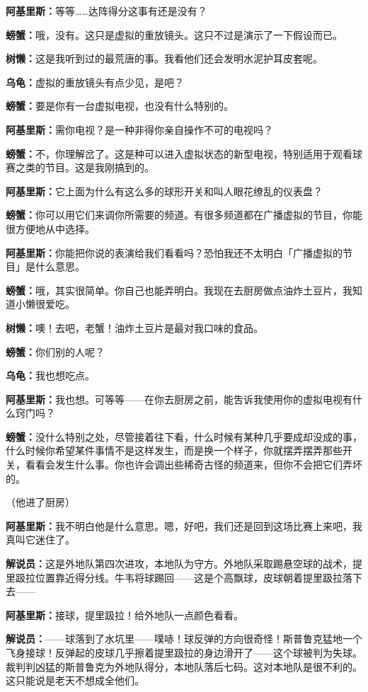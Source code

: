 \documentclass[
  12pt,
  twoside,
  openright,
  oldfontcommands,
]{memoir}
\newcommand{\dialogname}[1]{{\heifamily\bfseries #1}}
\begin{document}
\dialogname{阿基里斯：}等等\ldots\ldots 达阵得分这事有还是没有？

\dialogname{螃蟹：}哦，没有。这只是虚拟的重放镜头。这只不过是演示了一下假设而已。

\dialogname{树懒：}这是我听到过的最荒唐的事。我看他们还会发明水泥护耳皮套呢。

\dialogname{乌龟：}虚拟的重放镜头有点少见，是吧？

\dialogname{螃蟹：}要是你有一台虚拟电视，也没有什么特别的。

\dialogname{阿基里斯：}需你电视？是一种非得你亲自操作不可的电视吗？

\dialogname{螃蟹：}不，你理解岔了。这是种可以进入虚拟状态的新型电视，特别适用于观看球赛之类的节目。这是我刚搞到的。

\dialogname{阿基里斯：}它上面为什么有这么多的球形开关和叫人眼花缭乱的仪表盘？

\dialogname{螃蟹：}你可以用它们来调你所需要的频道。有很多频道都在广播虚拟的节目，你能很方便地从中选择。

\dialogname{阿基里斯：}你能把你说的表演给我们看看吗？恐怕我还不太明白「广播虚拟的节目」是什么意思。

\dialogname{螃蟹：}哦，其实很简单。你自己也能弄明白。我现在去厨房做点油炸土豆片，我知道小懒很爱吃。

\dialogname{树懒：}噢！去吧，老蟹！油炸土豆片是最对我口味的食品。

\dialogname{螃蟹：}你们别的人呢？

\dialogname{乌龟：}我也想吃点。

\dialogname{阿基里斯：}我也想。可等等------在你去厨房之前，能吿诉我使用你的虚拟电视有什么窍门吗？

\dialogname{螃蟹：}没什么特别之处，尽管接着往下看，什么时候有某种几乎要成却没成的事，什么时候你希望某件事情不是这样发生，而是换一个样子，你就摆弄摆弄那些开关，看看会发生什么事。你也许会调出些稀奇古怪的频道来，但你不会把它们弄坏的。

（他进了厨房）

\dialogname{阿基里斯：}我不明白他是什么意思。嗯，好吧，我们还是回到这场比赛上来吧，我真叫它迷住了。

\dialogname{解说员：}这是外地队第四次进攻，本地队为守方。外地队采取踢悬空球的战术，提里趿拉位置靠近得分线。牛韦将球踢回------这是个高飘球，皮球朝着提里趿拉落下去------

\dialogname{阿基里斯：}接球，提里趿拉！给外地队一点颜色看看。

\dialogname{解说员：}------球落到了水坑里------噗哧！球反弹的方向很奇怪！斯普鲁克猛地一个飞身接球！反弹起的皮球几乎擦着提里趿拉的身边滑开了------这个球被判为失球。裁判判凶猛的斯普鲁克为外地队得分，本地队落后七码。这对本地队是很不利的。这只能说是老天不想成全他们。
\end{document}
